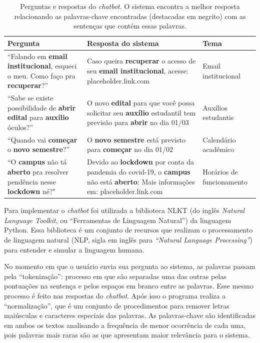 \documentclass[12pt]{article}
\begin{document}
\begin{table}[h]
\caption{Perguntas e respostas do {\itshape chatbot}. O sistema encontra a melhor resposta relacionando as palavras-chave encontradas (destacadas em negrito) com as sentenças que contém essas palavras.}
\label{table:1}
\begin{tabular}{ |p{4.25cm}|p{5cm}|p{4.25cm}|  }
 \hline
Pergunta & Resposta do sistema & Tema\\
 \hline
 “Falando em \textbf{email institucional}, esqueci o meu. Como faço pra \textbf{recuperar}?”   & Caso queira \textbf{recuperar} o acesso de seu \textbf{email institucional}, acesse: placeholder.link.com &   Email institucional \\
 \hline
 “Sabe se existe possibilidade de \textbf{abrir edital} para \textbf{auxílio} óculos?”   & O novo \textbf{edital} para que você possa solicitar seu \textbf{auxílio} estudantil tem previsão para \textbf{abrir} no dia 01/03 &   Auxílios estudantis \\
 \hline
 “Quando vai \textbf{começar} o \textbf{novo semestre}?”   & O \textbf{novo semestre} está previsto para \textbf{começar} no dia 01/02 &   Calendário acadêmico \\
 \hline
 “O \textbf{campus} não tá \textbf{aberto} pra resolver pendência nesse \textbf{lockdown} né?"   & Devido ao \textbf{lockdown} por conta da pandemia do covid-19, o \textbf{campus} não está \textbf{aberto}; Mais informações em: placeholder.link.com &   Horários de funcionamento \\
 
 \hline
\end{tabular}
\end{table}

Para implementar o {\itshape chatbot} foi utilizada a biblioteca NLKT (do inglês {\itshape Natural Language Toolkit}, ou “Ferramentas de Linguagem Natural”) da linguagem Python. Essa biblioteca é um conjunto de recursos que realizam o processamento de linguagem natural (NLP, sigla em inglês para {\itshape “Natural Language Processing”}) para entender e simular a linguagem humana.

No momento em que o usuário envia sua pergunta ao sistema, as palavras passam pela “tokenização”: processo em que são separadas uma das outras pelas pontuações na sentença e pelos espaços em branco entre as palavras. Esse mesmo processo é feito nas respostas do {\itshape chatbot}. Após isso o programa realiza a “normalização”, que é um conjunto de procedimentos para remover letras maiúsculas e caracteres especiais das palavras. As palavras-chave são identificadas em ambos os textos analisando a frequência de menor ocorrência de cada uma, pois palavras mais raras são as que apresentam maior relevância para o sistema.
\end{document}
